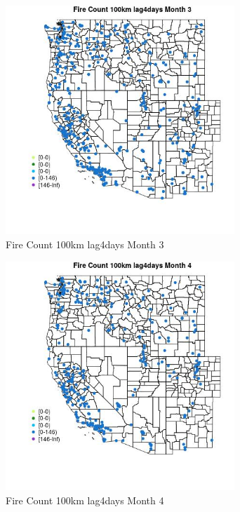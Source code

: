 \begin{figure} 
\centering  
\includegraphics[width=0.77\textwidth]{Code_Outputs/Report_ML_input_PM25_Step4_part_e_de_duplicated_aves_compiled_2019-05-18wNAs_MapObsMo3Fire_Count_100km_lag4days.jpg} 
\caption{\label{fig:Report_ML_input_PM25_Step4_part_e_de_duplicated_aves_compiled_2019-05-18wNAsMapObsMo3Fire_Count_100km_lag4days}Fire Count 100km lag4days Month 3} 
\end{figure} 
 

\begin{figure} 
\centering  
\includegraphics[width=0.77\textwidth]{Code_Outputs/Report_ML_input_PM25_Step4_part_e_de_duplicated_aves_compiled_2019-05-18wNAs_MapObsMo4Fire_Count_100km_lag4days.jpg} 
\caption{\label{fig:Report_ML_input_PM25_Step4_part_e_de_duplicated_aves_compiled_2019-05-18wNAsMapObsMo4Fire_Count_100km_lag4days}Fire Count 100km lag4days Month 4} 
\end{figure} 
 


